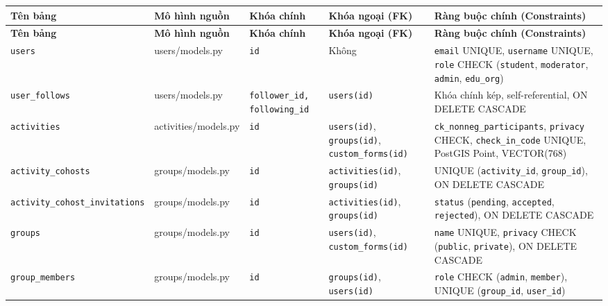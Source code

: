 \begingroup
\singlespacing
\small
\renewcommand{\arraystretch}{1.25}
\begin{xltabular}{\textwidth}{|>{\raggedright\arraybackslash\ttfamily\footnotesize}p{3.0cm}|>{\raggedright\arraybackslash\footnotesize}p{2.2cm}|>{\centering\arraybackslash\footnotesize}p{1.3cm}|>{\raggedright\arraybackslash\footnotesize}p{2.6cm}|>{\raggedright\arraybackslash\footnotesize}X|}
\hline
\textbf{Tên bảng} & \textbf{Mô hình nguồn} & \textbf{Khóa chính} & \textbf{Khóa ngoại (FK)} & \textbf{Ràng buộc chính (Constraints)} \\ \hline
\endfirsthead
\hline
\textbf{Tên bảng} & \textbf{Mô hình nguồn} & \textbf{Khóa chính} & \textbf{Khóa ngoại (FK)} & \textbf{Ràng buộc chính (Constraints)} \\ \hline
\endhead
\hline
\endfoot
\hline
\endlastfoot
\texttt{users} & users/\allowbreak models.py & \texttt{id} & Không & \texttt{email} UNIQUE, \texttt{username} UNIQUE, \texttt{role} CHECK (\texttt{student}, \texttt{moderator}, \texttt{admin}, \texttt{edu\_org}) \\ \hline
\texttt{user\_\allowbreak follows} & users/\allowbreak models.py & \texttt{follower\_id,} \texttt{following\_id} & \texttt{users(id)} & Khóa chính kép, self-referential, ON DELETE CASCADE \\ \hline
\texttt{activities} & activities/\allowbreak models.py & \texttt{id} & \texttt{users(id)}, \texttt{groups(id)}, \texttt{custom\_forms(id)} & \texttt{ck\_nonneg\_participants}, \texttt{privacy} CHECK, \texttt{check\_in\_code} UNIQUE, PostGIS Point, VECTOR(768) \\ \hline
\texttt{activity\_\allowbreak cohosts} & groups/\allowbreak models.py & \texttt{id} & \texttt{activities(id)}, \texttt{groups(id)} & UNIQUE (\texttt{activity\_id}, \texttt{group\_id}), ON DELETE CASCADE \\ \hline
\texttt{activity\_\allowbreak cohost\_\allowbreak invitations} & groups/\allowbreak models.py & \texttt{id} & \texttt{activities(id)}, \texttt{groups(id)} & \texttt{status} (\texttt{pending}, \texttt{accepted}, \texttt{rejected}), ON DELETE CASCADE \\ \hline
\texttt{groups} & groups/\allowbreak models.py & \texttt{id} & \texttt{users(id)}, \texttt{custom\_forms(id)} & \texttt{name} UNIQUE, \texttt{privacy} CHECK (\texttt{public}, \texttt{private}), ON DELETE CASCADE \\ \hline
\texttt{group\_\allowbreak members} & groups/\allowbreak models.py & \texttt{id} & \texttt{groups(id)}, \texttt{users(id)} & \texttt{role} CHECK (\texttt{admin}, \texttt{member}), UNIQUE (\texttt{group\_id}, \texttt{user\_id}) \\ \hline

\end{xltabular}
